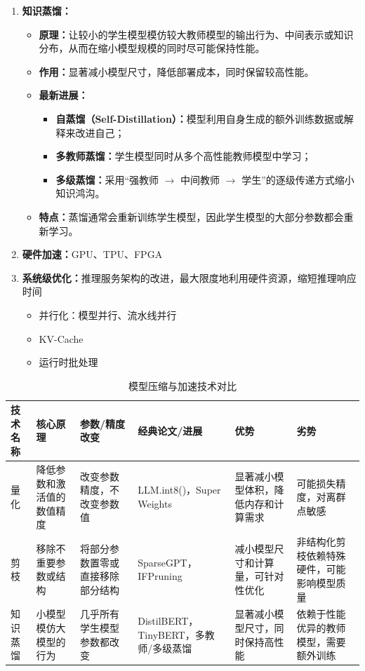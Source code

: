 \documentclass[../main.tex]{subfiles}
\begin{document}
\begin{enumerate}
\begin{enumerate}
    \item \textbf{知识蒸馏：}
    \begin{itemize}
        \item \textbf{原理：}让较小的学生模型模仿较大教师模型的输出行为、中间表示或知识分布，从而在缩小模型规模的同时尽可能保持性能。
        \item \textbf{作用：}显著减小模型尺寸，降低部署成本，同时保留较高性能。
        \item \textbf{最新进展：}
        \begin{itemize}
            \item \textbf{自蒸馏（Self-Distillation）：}模型利用自身生成的额外训练数据或解释来改进自己；
            \item \textbf{多教师蒸馏：}学生模型同时从多个高性能教师模型中学习；
            \item \textbf{多级蒸馏：}采用“强教师 $\rightarrow$ 中间教师 $\rightarrow$ 学生”的逐级传递方式缩小知识鸿沟。
        \end{itemize}
        \item \textbf{特点：}蒸馏通常会重新训练学生模型，因此学生模型的大部分参数都会重新学习。
    \end{itemize}
        \item \textbf{硬件加速：}GPU、TPU、FPGA
        \item \textbf{系统级优化：}推理服务架构的改进，最大限度地利用硬件资源，缩短推理响应时间
        \begin{itemize}
            \item 并行化：模型并行、流水线并行
            \item KV-Cache
            \item 运行时批处理
        \end{itemize}
    \end{enumerate}
\end{enumerate}
\begin{table}[H]
    \centering
    \caption{模型压缩与加速技术对比}
    \begin{tabularx}{\textwidth}{p{1.5cm}XXXXX}
        \toprule
        技术名称 & 核心原理 & 参数/精度改变 & 经典论文/进展 & 优势 & 劣势 \\
        \midrule
        量化 & 降低参数和激活值的数值精度 & 改变参数精度，不改变参数值 & LLM.int8()，Super Weights & 显著减小模型体积，降低内存和计算需求 & 可能损失精度，对离群点敏感 \\
        
        剪枝 & 移除不重要参数或结构 & 将部分参数置零或直接移除部分结构 & SparseGPT，IFPruning & 减小模型尺寸和计算量，可针对性优化 & 非结构化剪枝依赖特殊硬件，可能影响模型质量 \\
        
        知识蒸馏 & 小模型模仿大模型的行为 & 几乎所有学生模型参数都改变 & DistilBERT，TinyBERT，多教师/多级蒸馏 & 显著减小模型尺寸，同时保持高性能 & 依赖于性能优异的教师模型，需要额外训练 \\
        \bottomrule
    \end{tabularx}
\end{table}
\end{document}
